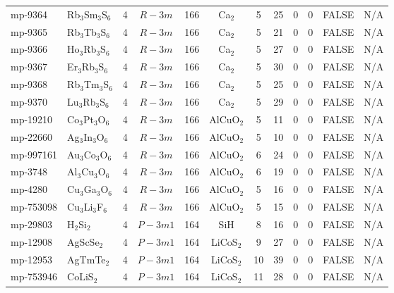 {\begin{longtable}{llcccccccccc}
    mp-9364 & Rb$_{3}$Sm$_{3}$S$_{6}$ & 4     & $R-3m$ & 166   & Ca$_{2}$ & 5     & 25    & 0     & 0     & FALSE & N/A \\
    mp-9365 & Rb$_{3}$Tb$_{3}$S$_{6}$ & 4     & $R-3m$ & 166   & Ca$_{2}$ & 5     & 21    & 0     & 0     & FALSE & N/A \\
    mp-9366 & Ho$_{3}$Rb$_{3}$S$_{6}$ & 4     & $R-3m$ & 166   & Ca$_{2}$ & 5     & 27    & 0     & 0     & FALSE & N/A \\
    mp-9367 & Er$_{3}$Rb$_{3}$S$_{6}$ & 4     & $R-3m$ & 166   & Ca$_{2}$ & 5     & 30    & 0     & 0     & FALSE & N/A \\
    mp-9368 & Rb$_{3}$Tm$_{3}$S$_{6}$ & 4     & $R-3m$ & 166   & Ca$_{2}$ & 5     & 25    & 0     & 0     & FALSE & N/A \\
    mp-9370 & Lu$_{3}$Rb$_{3}$S$_{6}$ & 4     & $R-3m$ & 166   & Ca$_{2}$ & 5     & 29    & 0     & 0     & FALSE & N/A \\
    mp-19210 & Co$_{3}$Pt$_{3}$O$_{6}$ & 4     & $R-3m$ & 166   & AlCuO$_{2}$ & 5     & 11    & 0     & 0     & FALSE & N/A \\
    mp-22660 & Ag$_{3}$In$_{3}$O$_{6}$ & 4     & $R-3m$ & 166   & AlCuO$_{2}$ & 5     & 10    & 0     & 0     & FALSE & N/A \\
    mp-997161 & Au$_{3}$Co$_{3}$O$_{6}$ & 4     & $R-3m$ & 166   & AlCuO$_{2}$ & 6     & 24    & 0     & 0     & FALSE & N/A \\
    mp-3748 & Al$_{3}$Cu$_{3}$O$_{6}$ & 4     & $R-3m$ & 166   & AlCuO$_{2}$ & 6     & 19    & 0     & 0     & FALSE & N/A \\
    mp-4280 & Cu$_{3}$Ga$_{3}$O$_{6}$ & 4     & $R-3m$ & 166   & AlCuO$_{2}$ & 5     & 16    & 0     & 0     & FALSE & N/A \\
    mp-753098 & Cu$_{3}$Li$_{3}$F$_{6}$ & 4     & $R-3m$ & 166   & AlCuO$_{2}$ & 5     & 15    & 0     & 0     & FALSE & N/A \\
    mp-29803 & H$_{2}$Si$_{2}$ & 4     & $P-3m1$ & 164   & SiH   & 8     & 16    & 0     & 0     & FALSE & N/A \\
    mp-12908 & AgScSe$_{2}$ & 4     & $P-3m1$ & 164   & LiCoS$_{2}$ & 9     & 27    & 0     & 0     & FALSE & N/A \\
    mp-12953 & AgTmTe$_{2}$ & 4     & $P-3m1$ & 164   & LiCoS$_{2}$ & 10    & 39    & 0     & 0     & FALSE & N/A \\
    mp-753946 & CoLiS$_{2}$ & 4     & $P-3m1$ & 164   & LiCoS$_{2}$ & 11    & 28    & 0     & 0     & FALSE & N/A \\

\end{longtable}}
